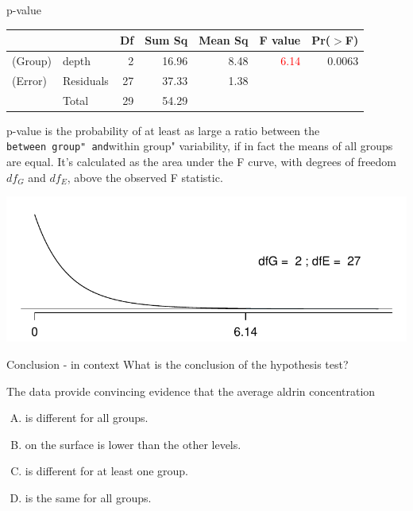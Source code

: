 \documentclass[
  ignorenonframetext,
]{beamer}
\begin{document}
\begin{frame}[fragile]{p-value}
\protect\hypertarget{p-value}{}
\begin{center}
\begin{tabular}{ll rrrrr}
\hline
            &           & Df    & Sum Sq    & Mean Sq   & F value   & Pr($>$F) \\ 
\hline
(\alert{G}roup)     & depth         & 2     & 16.96 & 8.48      & \textcolor{red}{6.14}     & 0.0063 \\ 
(\alert{E}rror)     & Residuals     & 27    & 37.33     & 1.38      &       &  \\ 
\hline
            & \alert{T}otal & 29    & 54.29 \\
\end{tabular}
\end{center}

p-value is the probability of at least as large a ratio between the
\texttt{between\ group"\ and}within group" variability, if in fact the
means of all groups are equal. It's calculated as the area under the F
curve, with degrees of freedom \(df_G\) and \(df_E\), above the observed
F statistic.

\pause

\includegraphics[width=\textwidth,height=0.45\textheight]{images/f.pdf}
\end{frame}

\begin{frame}{Conclusion - in context}
\protect\hypertarget{conclusion---in-context}{}
\alert{What is the conclusion of the hypothesis test?}

The data provide convincing evidence that the average aldrin
concentration

\begin{enumerate}
[A)]
\item
  is different for all groups.
\item
  on the surface is lower than the other levels.
\item
  is different for at least one group.
\item
  is the same for all groups.
\end{enumerate}
\end{frame}
\end{document}
